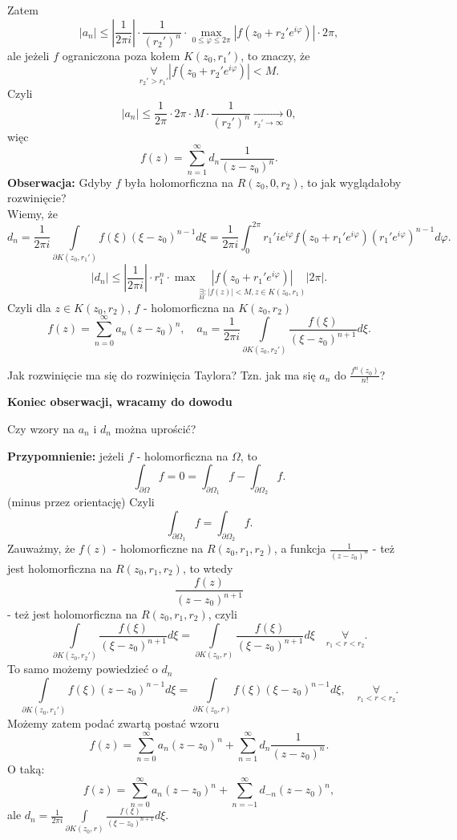 \documentclass[../main.tex]{subfiles}
\begin{document}
Zatem
\[
    |a_n| \le |\frac{1}{2 \pi i}| \cdot \frac{1}{(r_2')^n}\cdot \max\limits_{0 \le \varphi \le 2\pi} \left| f(z_0+r_2'e^{i\varphi}) \right| \cdot 2\pi
,\]
ale jeżeli $f$ ograniczona poza kołem $K(z_0,r_1')$, to znaczy, że
\[
    \underset{r_2' > r_1'}{\forall} \left| f(z_0+r_2'e^{i\varphi}) \right| < M
.\]
Czyli
\[
    |a_n| \le \frac{1}{2\pi} \cdot 2\pi \cdot M \cdot \frac{1}{(r_2')^n} \underset{r_2'\to \infty}{\longrightarrow} 0
,\]
więc
\[
    f(z) = \sum_{n=1}^{\infty} d_n \frac{1}{(z-z_0)^n}
.\]
\textbf{Obserwacja:} Gdyby $f$ była holomorficzna na $R(z_0,0,r_2)$, to jak wyglądałoby rozwinięcie?\\
Wiemy, że
\[
    d_n = \frac{1}{2\pi i}\int\limits_{ \partial K(z_0,r_1')} f(\xi)(\xi - z_0)^{n-1}d\xi = \frac{1}{2\pi i}\int_{0}^{2\pi} r_1'ie^{i\varphi}f(z_0+r_1'e^{i\varphi})(r_1'e^{i\varphi})^{n-1}d\varphi
.\]
\[
    |d_n| \le \left| \frac{1}{2\pi i} \right| \cdot r_1^{n} \cdot  \max \underset{\underset{M}{\exists}: |f(z)| < M, z\in K(z_0,r_1)}{\left| f(z_0 + r_1'e^{i\varphi}) \right| }|2\pi|
.\]
Czyli dla $z\in K(z_0,r_2)$, $f$ - holomorficzna na $K(z_0,r_2)$
\[
    f(z) = \sum_{n=0}^{\infty} a_n (z-z_0)^n,\quad a_n = \frac{1}{2\pi i} \int\limits_{\partial K(z_0,r_2')} \frac{f(\xi)}{(\xi - z_0)^{n+1}}d\xi
.\]
\begin{pytanie}
    Jak rozwinięcie ma się do rozwinięcia Taylora? Tzn. jak ma się $a_n$ do $\frac{f^n(z_0)}{n!}$?
\end{pytanie}
\textbf{Koniec obserwacji, wracamy do dowodu}

\begin{pytanie}
    Czy wzory na $a_n$ i $d_n$ można uprościć?
\end{pytanie}
\textbf{Przypomnienie:} jeżeli $f$ - holomorficzna na $\Omega$, to
\[
\int_{\partial \Omega} f = 0 = \int_{\partial \Omega_1}f - \int_{\partial \Omega_2}f
.\]
(minus przez orientację) Czyli
\[
\int_{\partial \Omega_1}f = \int_{\partial \Omega_2}f
.\]
Zauważmy, że $f(z)$ - holomorficzne na $R(z_0,r_1,r_2)$, a funkcja $\frac{1}{(z-z_0)^n}$ - też jest holomorficzna na $R(z_0,r_1,r_2)$, to wtedy \[
    \frac{f(z)}{(z-z_0)^{n+1}}
\]
 - też jest holomorficzna na $R(z_0,r_1,r_2)$, czyli
 \[
     \int\limits_{\partial K(z_0,r_2')} \frac{f(\xi)}{(\xi - z_0)^{n+1}}d\xi = \int\limits_{\partial K(z_0,r)} \frac{f(\xi)}{(\xi - z_0)^{n+1}}d\xi \quad\underset{r_1 < r < r_2}{\forall}
 .\]
 To samo możemy powiedzieć o $d_n$
  \[
      \int\limits_{\partial K(z_0,r_1')} f(\xi)(z-z_0)^{n-1} d\xi = \int\limits_{\partial K(z_0,r)} f(\xi)(\xi - z_0)^{n-1}d\xi,\quad \underset{r_1<r<r_2}{\forall}
 .\]
 Możemy zatem podać zwartą postać wzoru
 \[
     f(z) = \sum_{n=0}^{\infty} a_n (z-z_0)^n + \sum_{n=1}^{\infty} d_n \frac{1}{(z-z_0)^n}
 .\]
 O taką:
 \[
     f(z) = \sum_{n=0}^{\infty} a_n (z-z_0)^n + \sum_{n=-1}^{\infty} d_{-n}(z-z_0)^n
 ,\]
 ale $d_n = \frac{1}{2\pi i}\int\limits_{\partial K(z_0,r)} \frac{f(\xi)}{(\xi - z_0)^{n+1}}d\xi$.
\end{document}
